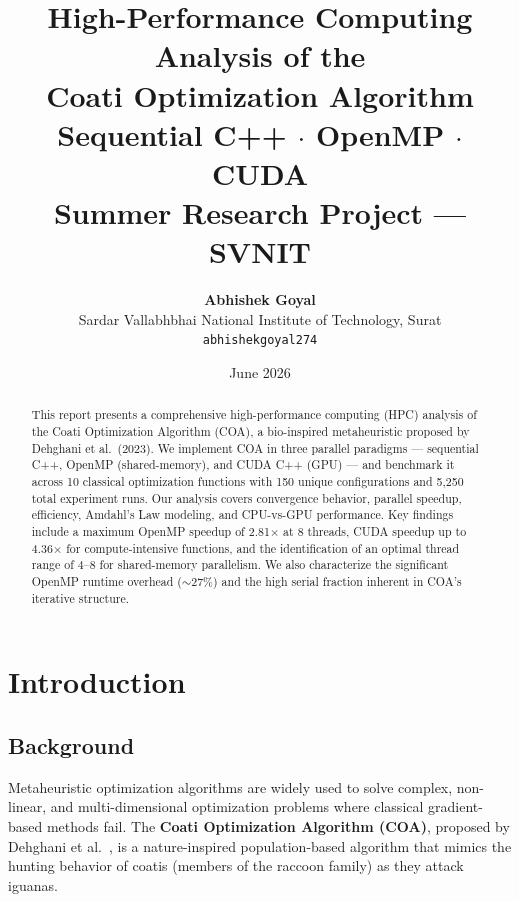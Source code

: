 \documentclass[12pt, a4paper]{article}
\title{
    \vspace{-1cm}
    {\Large \textbf{High-Performance Computing Analysis of the\\Coati Optimization Algorithm}}\\[0.5cm]
    {\large Sequential C++ $\cdot$ OpenMP $\cdot$ CUDA}\\[0.3cm]
    {\normalsize Summer Research Project — SVNIT}
}
\author{
    \textbf{Abhishek Goyal}\\
    Sardar Vallabhbhai National Institute of Technology, Surat\\
    \texttt{abhishekgoyal274}
}
\date{June 2026}
\begin{document}

\maketitle
\thispagestyle{fancy}

\begin{abstract}
This report presents a comprehensive high-performance computing (HPC) analysis of the Coati Optimization Algorithm (COA), a bio-inspired metaheuristic proposed by Dehghani et al.\ (2023). We implement COA in three parallel paradigms — sequential C++, OpenMP (shared-memory), and CUDA C++ (GPU) — and benchmark it across 10 classical optimization functions with 150 unique configurations and 5,250 total experiment runs. Our analysis covers convergence behavior, parallel speedup, efficiency, Amdahl's Law modeling, and CPU-vs-GPU performance. Key findings include a maximum OpenMP speedup of 2.81$\times$ at 8 threads, CUDA speedup up to 4.36$\times$ for compute-intensive functions, and the identification of an optimal thread range of 4--8 for shared-memory parallelism. We also characterize the significant OpenMP runtime overhead ($\sim$27\%) and the high serial fraction inherent in COA's iterative structure.
\end{abstract}

\tableofcontents
\newpage

\section{Introduction}

\subsection{Background}

Metaheuristic optimization algorithms are widely used to solve complex, non-linear, and multi-dimensional optimization problems where classical gradient-based methods fail. The \textbf{Coati Optimization Algorithm (COA)}, proposed by Dehghani et al.\ \cite{dehghani2023}, is a nature-inspired population-based algorithm that mimics the hunting behavior of coatis (members of the raccoon family) as they attack iguanas.
\end{document}
